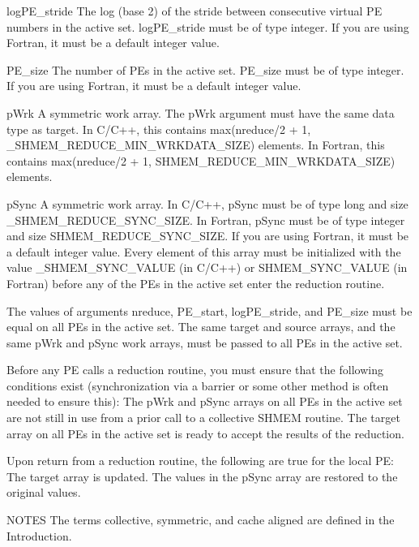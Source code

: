        logPE_stride The log (base 2) of the stride between consecutive virtual
		    PE numbers in the active set.   logPE_stride  must	be  of
		    type  integer.   If	 you  are  using Fortran, it must be a
		    default integer value.

       PE_size	    The number of PEs in the active set.  PE_size must	be  of
		    type  integer.   If	 you  are  using Fortran, it must be a
		    default integer value.

       pWrk	    A symmetric work array.  The pWrk argument must  have  the
		    same  data	type  as  target.   In	C/C++,	this  contains
		    max(nreduce/2 + 1, _SHMEM_REDUCE_MIN_WRKDATA_SIZE)
		    elements.	     In	      Fortran,	    this      contains
		    max(nreduce/2 + 1, SHMEM_REDUCE_MIN_WRKDATA_SIZE)
		    elements.

       pSync	    A  symmetric  work array.  In C/C++, pSync must be of type
		    long and size _SHMEM_REDUCE_SYNC_SIZE.  In Fortran,	 pSync
		    must  be  of type integer and size SHMEM_REDUCE_SYNC_SIZE.
		    If you are using Fortran, it must  be  a  default  integer
		    value.   Every  element  of this array must be initialized
		    with   the	 value	 _SHMEM_SYNC_VALUE   (in   C/C++)   or
		    SHMEM_SYNC_VALUE (in Fortran) before any of the PEs in the
		    active set enter the reduction routine.

       The values of arguments nreduce, PE_start,  logPE_stride,  and  PE_size
       must be equal on all PEs in the active set.  The same target and source
       arrays, and the same pWrk and pSync work arrays, must be passed to  all
       PEs in the active set.

       Before  any  PE	calls  a  reduction  routine, you must ensure that the
       following conditions exist (synchronization via a barrier or some other
       method  is  often  needed to ensure this): The pWrk and pSync arrays on
       all PEs in the active set are not still in use from a prior call	 to  a
       collective  SHMEM  routine.   The target array on all PEs in the active
       set is ready to accept the results of the reduction.

       Upon return from a reduction routine, the following are	true  for  the
       local  PE:  The target array is updated.	 The values in the pSync array
       are restored to the original values.

NOTES
       The terms collective, symmetric,	 and  cache  aligned  are  defined  in
       the Introduction.

